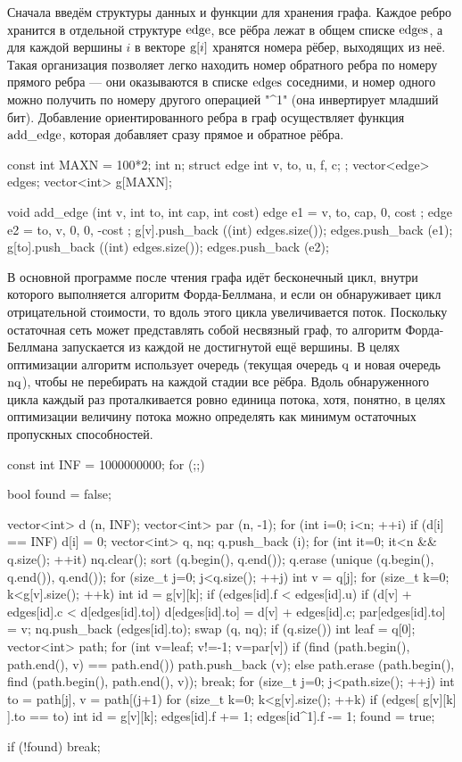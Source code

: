 Сначала введём структуры данных и функции для хранения графа. Каждое ребро хранится в отдельной структуре $\rm edge$, все рёбра лежат в общем списке $\rm edges$, а для каждой вершины $i$ в векторе ${\rm g}[i]$ хранятся номера рёбер, выходящих из неё. Такая организация позволяет легко находить номер обратного ребра по номеру прямого ребра --- они оказываются в списке $\rm edges$ соседними, и номер одного можно получить по номеру другого операцией "^1" (она инвертирует младший бит). Добавление ориентированного ребра в граф осуществляет функция $\rm add\_edge$, которая добавляет сразу прямое и обратное рёбра.

\code
const int MAXN = 100*2;
int n;
struct edge {
	int v, to, u, f, c;
};
vector<edge> edges;
vector<int> g[MAXN];

void add_edge (int v, int to, int cap, int cost) {
	edge e1 = { v, to, cap, 0, cost };
	edge e2 = { to, v, 0, 0, -cost };
	g[v].push_back ((int) edges.size());
	edges.push_back (e1);
	g[to].push_back ((int) edges.size());
	edges.push_back (e2);
}
\endcode

В основной программе после чтения графа идёт бесконечный цикл, внутри которого выполняется алгоритм Форда-Беллмана, и если он обнаруживает цикл отрицательной стоимости, то вдоль этого цикла увеличивается поток. Поскольку остаточная сеть может представлять собой несвязный граф, то алгоритм Форда-Беллмана запускается из каждой не достигнутой ещё вершины. В целях оптимизации алгоритм использует очередь (текущая очередь $\rm q$ и новая очередь $\rm nq$), чтобы не перебирать на каждой стадии все рёбра. Вдоль обнаруженного цикла каждый раз проталкивается ровно единица потока, хотя, понятно, в целях оптимизации величину потока можно определять как минимум остаточных пропускных способностей.

\code
const int INF = 1000000000;
for (;;) {
	bool found = false;

	vector<int> d (n, INF);
	vector<int> par (n, -1);
	for (int i=0; i<n; ++i)
		if (d[i] == INF) {
			d[i] = 0;
			vector<int> q, nq;
			q.push_back (i);
			for (int it=0; it<n && q.size(); ++it) {
				nq.clear();
				sort (q.begin(), q.end());
				q.erase (unique (q.begin(), q.end()), q.end());
				for (size_t j=0; j<q.size(); ++j) {
					int v = q[j];
					for (size_t k=0; k<g[v].size(); ++k) {
						int id = g[v][k];
						if (edges[id].f < edges[id].u)
							if (d[v] + edges[id].c < d[edges[id].to]) {
								d[edges[id].to] = d[v] + edges[id].c;
								par[edges[id].to] = v;
								nq.push_back (edges[id].to);
							}
					}
				}
				swap (q, nq);
			}
			if (q.size()) {
				int leaf = q[0];
				vector<int> path;
				for (int v=leaf; v!=-1; v=par[v])
					if (find (path.begin(), path.end(), v) == path.end())
						path.push_back (v);
					else {
						path.erase (path.begin(), find (path.begin(), path.end(), v));
						break;
					}
				for (size_t j=0; j<path.size(); ++j) {
					int to = path[j],  v = path[(j+1)%
					for (size_t k=0; k<g[v].size(); ++k)
						if (edges[ g[v][k] ].to == to) {
							int id = g[v][k];
							edges[id].f += 1;
							edges[id^1].f -= 1;
						}
				}
				found = true;
			}
		}

	if (!found)  break;
}
\endcode


